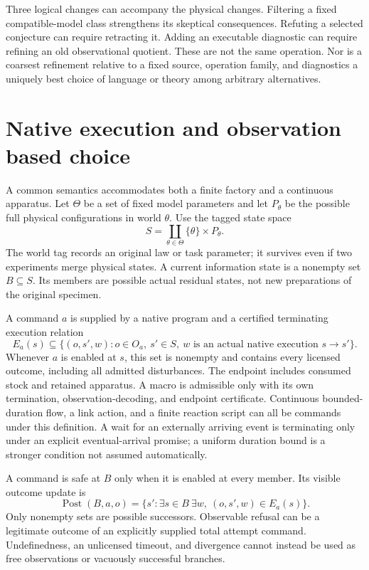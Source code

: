 \documentclass[11pt]{article}
\theoremstyle{definition}
\theoremstyle{remark}
\begin{document}
Three logical changes can accompany the physical changes. Filtering a
fixed compatible-model class strengthens its skeptical consequences.
Refuting a selected conjecture can require retracting it. Adding an
executable diagnostic can require refining an old observational
quotient. These are not the same operation. Nor is a coarsest refinement
relative to a fixed source, operation family, and diagnostics a uniquely
best choice of language or theory among arbitrary alternatives.


\section{Native execution and observation based choice}\label{sec:native-semantics}
A common semantics accommodates both a finite factory and a continuous
apparatus. Let $\Theta$ be a set of fixed model parameters and let
$P_\theta$ be the possible full physical configurations in world $\theta$.
Use the tagged state space
\[
 S=\coprod_{\theta\in\Theta}\{\theta\}\times P_\theta.
\]
The world tag records an original law or task parameter; it survives even
if two experiments merge physical states. A current information state is
a nonempty set $B\subseteq S$. Its members are possible actual residual
states, not new preparations of the original specimen.

A command $a$ is supplied by a native program and a certified terminating
execution relation
\[
 E_a(s)\subseteq\{(o,s',w):o\in O_a,\ s'\in S,\
                         w\text{ is an actual native execution }s\to s'\}.
\]
Whenever $a$ is enabled at $s$, this set is nonempty and contains every
licensed outcome, including all admitted disturbances. The endpoint
includes consumed stock and retained apparatus. A macro is admissible
only with its own termination, observation-decoding, and endpoint
certificate. Continuous bounded-duration flow, a link action, and a
finite reaction script can all be commands under this definition.
A wait for an externally arriving event is terminating only under an
explicit eventual-arrival promise; a uniform duration bound is a stronger
condition not assumed automatically.

A command is safe at $B$ only when it is enabled at every member. Its
visible outcome update is
\begin{equation}\label{eq:general-post}
 \operatorname{Post}(B,a,o)=
 \{s':\exists s\in B\ \exists w,\ (o,s',w)\in E_a(s)\}.
\end{equation}
Only nonempty sets are possible successors. Observable refusal can be a
legitimate outcome of an explicitly supplied total attempt command.
Undefinedness, an unlicensed timeout, and divergence cannot instead be
used as free observations or vacuously successful branches.
\end{document}
